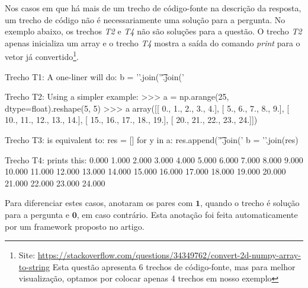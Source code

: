 Nos casos em que há mais de um trecho de código-fonte na descrição da resposta, um trecho de código não é necessariamente uma solução para a pergunta. No exemplo abaixo, os trechos \emph{T2} e \emph{T4} não são soluções para a questão. O trecho \emph{T2} apenas inicializa um array e o trecho \emph{T4} mostra a saída do comando \textit{print} para o vetor já convertido\footnote{Site: \url{https://stackoverflow.com/questions/34349762/convert-2d-numpy-array-to-string} Esta questão apresenta 6 trechos de código-fonte, mas para melhor visualização, optamos por colocar apenas 4 trechos em nosso exemplo\label{foot:exemplo-stackoverflow-mais-de-um-trecho}}.



\begin{tcolorbox}[colframe=orange!75!black,colback=gray!15!white,fonttitle=\bfseries,adjusted title=\large{Título da questão: convert 2d numpy array to string}~\ref{foot:exemplo-stackoverflow-mais-de-um-trecho}]
\begin{mypythongreen}{Trecho T1: A one-liner will do:}
b = '\n'.join('\t'.join('%
\end{mypythongreen}

\begin{mypythonred}{Trecho T2: Using a simpler example:}
>>> a = np.arange(25, dtype=float).reshape(5, 5)
>>> a
array([[  0.,   1.,   2.,   3.,   4.],
       [  5.,   6.,   7.,   8.,   9.],
       [ 10.,  11.,  12.,  13.,  14.],
       [ 15.,  16.,  17.,  18.,  19.],
       [ 20.,  21.,  22.,  23.,  24.]])
\end{mypythonred}
\begin{mypythongreen}{Trecho T3: is equivalent to:}
res = []
for y in a:
    res.append('\t'.join('%
b = '\n'.join(res)
\end{mypythongreen}
\begin{mypythonred}{Trecho T4: prints this:}
0.000   1.000   2.000   3.000   4.000
5.000   6.000   7.000   8.000   9.000
10.000  11.000  12.000  13.000  14.000
15.000  16.000  17.000  18.000  19.000
20.000  21.000  22.000  23.000  24.000
\end{mypythonred}
\end{tcolorbox}






Para diferenciar estes casos, \cite{yao-2018} anotaram os pares com $\bm{1}$, quando o trecho é solução para a pergunta e $\bm{0}$, em caso contrário. Esta anotação foi feita automaticamente por um framework proposto no artigo.

